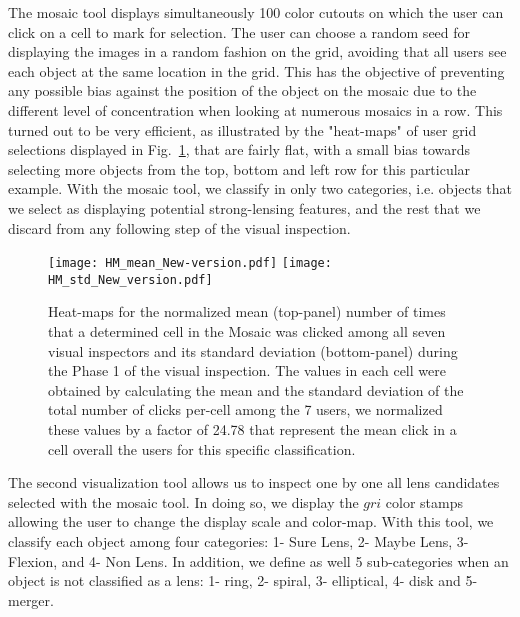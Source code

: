\documentclass[tradiabstract,twocolumn]{aa}
\begin{document}
The mosaic tool displays simultaneously 100 color cutouts on which the user can click on a cell to mark for selection. The user can choose a random seed for displaying the images in a random fashion on the grid, avoiding that all users see each object at the same location in the grid. This has the objective of preventing any possible bias against the position of the object on the mosaic due to the different level of concentration when looking at numerous mosaics in a row. This turned out to be very efficient, as illustrated by the "heat-maps" of user grid selections displayed in Fig.~\ref{fig:heatmap}, that are fairly flat, with a small bias towards selecting more objects from the top, bottom and left row for this particular example. With the mosaic tool, we classify in only two categories, i.e. objects that we select as displaying potential strong-lensing features, and the rest that we discard from any following step of the visual inspection. 

\begin{figure}[h!]
\texttt{[image: HM\_mean\_New-version.pdf]}
\texttt{[image: HM\_std\_New\_version.pdf]}
\caption{Heat-maps for the normalized mean (top-panel) number of times that a determined cell in the Mosaic was clicked among all seven visual inspectors and its standard deviation (bottom-panel) during the Phase 1 of the visual inspection. The values in each cell were obtained by calculating the mean and the standard deviation of the total number of clicks per-cell among the 7 users, we normalized these values by a factor of 24.78 that represent the mean click in a cell overall the users for this specific classification.}
\label{fig:heatmap}
\end{figure}

The second visualization tool allows us to inspect one by one all lens candidates selected with the mosaic tool. In doing so, we display the $gri$ color stamps allowing the user to change the display scale and color-map. With this tool, we classify each object among four categories: 1- Sure Lens, 2- Maybe Lens, 3- Flexion, and 4- Non Lens. In addition, we define as well 5 sub-categories when an object is not classified as a lens: 1- ring, 2- spiral, 3- elliptical, 4- disk and 5- merger.
\end{document}
